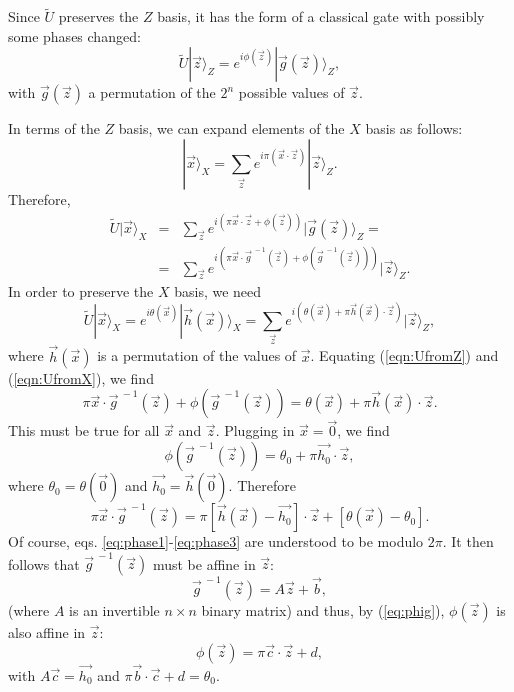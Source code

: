 \documentclass[aps,twocolumn,showpacs,nofootinbib,superscriptaddress]{revtex4}
\newcommand{\ket}[1]{|{#1}\rangle}
\begin{document}
Since $\tilde{U}$ preserves the $Z$ basis, it has the form of a classical
gate with possibly some phases changed:
\begin{equation}
\tilde{U} \ket{\vec{z}}_Z = e^{i\phi(\vec{z})} \ket{\vec{g}(\vec{z})}_Z,
\end{equation}
with $\vec{g}(\vec{z})$ a permutation of the $2^n$ possible values of $\vec{z}$.

In terms of the $Z$ basis, we can expand elements of the $X$ basis
as follows:
\begin{equation}
\ket{\vec{x}}_X = \sum_{\vec{z}} e^{i\pi (\vec{x} \cdot \vec{z})} \ket{\vec{z}}_Z.
\end{equation}
Therefore,
\begin{eqnarray}
\tilde{U} \ket{\vec{x}}_X & = & \sum_{\vec{z}} e^{i(\pi \vec{x} \cdot \vec{z} + \phi(\vec{z}))}
\ket{\vec{g}(\vec{z})}_Z =\nonumber\\
& = & \sum_{\vec{z}} e^{i(\pi \vec{x} \cdot \vec{g}^{~-1}(\vec{z}) + \phi(\vec{g}^{~-1}(\vec{z})))}
\ket{\vec{z}}_Z. \label{eqn:UfromZ}
\end{eqnarray}
In order to preserve the $X$ basis, we need
\begin{equation}
\tilde{U} \ket{\vec{x}}_X = e^{i\theta(\vec{x})} \ket{\vec{h}(\vec{x})}_X = \sum_{\vec{z}} e^{i (\theta(\vec{x})
+ \pi \vec{h}(\vec{x}) \cdot \vec{z})} \ket{\vec{z}}_Z, \label{eqn:UfromX}
\end{equation}
where $\vec{h}(\vec{x})$ is a permutation of the values of
$\vec{x}$. Equating (\ref{eqn:UfromZ}) and (\ref{eqn:UfromX}), we
find
\begin{equation}
\pi \vec{x} \cdot \vec{g}^{~-1}(\vec{z}) +
\phi(\vec{g}^{~-1}(\vec{z})) = \theta(\vec{x}) + \pi
\vec{h}(\vec{x}) \cdot \vec{z}.\label{eq:phase1}
\end{equation}
This must be true for all $\vec{x}$ and $\vec{z}$.  Plugging in $\vec{x}=\vec{0}$,
we find
\begin{equation}
\phi(\vec{g}^{~-1}(\vec{z})) = \theta_0 + \pi \vec{h_0} \cdot \vec{z},
\label{eq:phig}
\end{equation}
where $\theta_0 = \theta(\vec{0})$ and $\vec{h_0} = \vec{h}(\vec{0})$.
Therefore
\begin{equation}
\pi \vec{x} \cdot \vec{g}^{~-1}(\vec{z}) = \pi
\left[\vec{h}(\vec{x})-\vec{h_0} \right] \cdot \vec{z} +
\left[\theta(\vec{x}) - \theta_0 \right].\label{eq:phase3}
\end{equation}
Of course, eqs. \ref{eq:phase1}-\ref{eq:phase3} are understood to
be modulo $2\pi$. It then follows that $\vec{g}^{~-1}(\vec{z})$
must be affine in $\vec{z}$:
\begin{equation}
\vec{g}^{~-1}(\vec{z}) = A\vec{z} + \vec{b},
\end{equation}
(where $A$ is an invertible $n \times n$ binary matrix) and thus,
by (\ref{eq:phig}), $\phi(\vec{z})$ is also affine in $\vec{z}$:
\begin{equation}
\phi(\vec{z}) = \pi \vec{c} \cdot \vec{z} + d,
\end{equation}
with $A \vec{c} = \vec{h_0}$ and $\pi \vec{b} \cdot \vec{c} + d =
\theta_0$.
\end{document}
